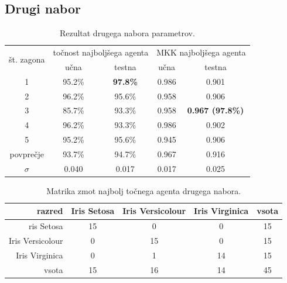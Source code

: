 \subsection{Drugi nabor}\label{subsec:dodatek-iris-drugi-nabor}
\begin{table}[H]
    \begin{center}
        \begin{tabular}{|| c | c c || c c ||}
            \hline
            \multirow{2}{*}{št. zagona} & \multicolumn{2}{c||}{točnost najboljšega agenta} & \multicolumn{2}{c||}{MKK najboljšega agenta} \\ \cline{2-5}
            & učna   & testna          & učna  & testna                  \\
            \hline
            1         & 95.2\% & \textbf{97.8\%} & 0.986 & 0.901                   \\
            \hline
            2         & 96.2\% & 95.6\%          & 0.958 & 0.906                   \\
            \hline
            3         & 85.7\% & 93.3\%          & 0.958 & \textbf{0.967 (97.8\%)} \\
            \hline
            4         & 96.2\% & 93.3\%          & 0.986 & 0.902                   \\
            \hline
            5         & 95.2\% & 95.6\%          & 0.945 & 0.906                   \\
            \hline
            povprečje & 93.7\% & 94.7\%          & 0.967 & 0.916                   \\
            \hline
            $\sigma$  & 0.040  & 0.017           & 0.017 & 0.025                   \\
            \hline
        \end{tabular}
    \end{center}
    \caption{Rezultat drugega nabora parametrov.}
    \label{tab:iris_result_2}
\end{table}

\begin{table}[H]
    \centering
    \begin{tabular}{||rcccc||}
        \hline
        razred           & Iris Setosa & Iris Versicolour & Iris Virginica & vsota \\ \hline
        ris Setosa       & 15          & 0                & 0              & 15    \\ \hline
        Iris Versicolour & 0           & 15               & 0              & 15    \\ \hline
        Iris Virginica   & 0           & 1                & 14             & 15    \\ \hline
        vsota            & 15          & 16               & 14             & 45    \\ \hline
    \end{tabular}
    \caption{Matrika zmot najbolj točnega agenta drugega nabora.}
    \label{tab:iris_acc_2}
\end{table}

